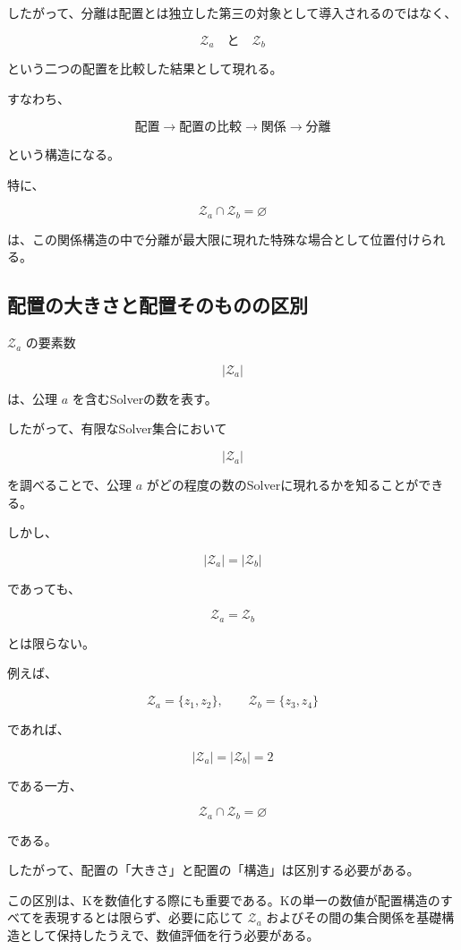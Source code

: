 したがって、分離は配置とは独立した第三の対象として導入されるのではなく、

\[
\mathcal{Z}_a
\quad\text{と}\quad
\mathcal{Z}_b
\]

という二つの配置を比較した結果として現れる。

すなわち、

\[
\text{配置}
\longrightarrow
\text{配置の比較}
\longrightarrow
\text{関係}
\longrightarrow
\text{分離}
\]

という構造になる。

特に、

\[
\mathcal{Z}_a\cap\mathcal{Z}_b=\varnothing
\]

は、この関係構造の中で分離が最大限に現れた特殊な場合として位置付けられる。

\subsection{配置の大きさと配置そのものの区別}

$\mathcal{Z}_a$ の要素数

\[
|\mathcal{Z}_a|
\]

は、公理 $a$ を含むSolverの数を表す。

したがって、有限なSolver集合において

\[
|\mathcal{Z}_a|
\]

を調べることで、公理 $a$ がどの程度の数のSolverに現れるかを知ることができる。

しかし、

\[
|\mathcal{Z}_a| = |\mathcal{Z}_b|
\]

であっても、

\[
\mathcal{Z}_a = \mathcal{Z}_b
\]

とは限らない。

例えば、

\[
\mathcal{Z}_a=\{z_1,z_2\},
\qquad
\mathcal{Z}_b=\{z_3,z_4\}
\]

であれば、

\[
|\mathcal{Z}_a| = |\mathcal{Z}_b| = 2
\]

である一方、

\[
\mathcal{Z}_a\cap\mathcal{Z}_b = \varnothing
\]

である。

したがって、配置の「大きさ」と配置の「構造」は区別する必要がある。

この区別は、Kを数値化する際にも重要である。Kの単一の数値が配置構造のすべてを表現するとは限らず、必要に応じて $\mathcal{Z}_a$ およびその間の集合関係を基礎構造として保持したうえで、数値評価を行う必要がある。

